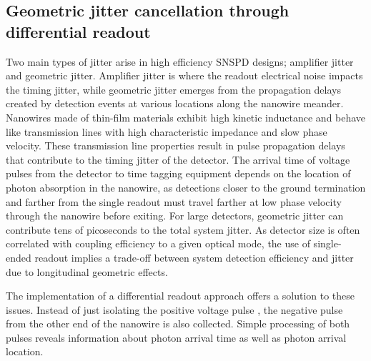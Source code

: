 \documentclass[11pt]{caltech_thesis} %
\begin{document}
\hypertarget{geometric-jitter-cancellation-through-differential-readout}{%
\subsection{Geometric jitter cancellation through differential readout}\label{geometric-jitter-cancellation-through-differential-readout}}

Two main types of jitter arise in high efficiency SNSPD designs; amplifier jitter and geometric jitter. Amplifier jitter is where the readout electrical noise impacts the timing jitter, while geometric jitter emerges from the propagation delays created by detection events at various locations along the nanowire meander. Nanowires made of thin-film materials exhibit high kinetic inductance and behave like transmission lines with high characteristic impedance and slow phase velocity. These transmission line properties result in pulse propagation delays that contribute to the timing jitter of the detector. The arrival time of voltage pulses from the detector to time tagging equipment depends on the location of photon absorption in the nanowire, as detections closer to the ground termination and farther from the single readout must travel farther at low phase velocity through the nanowire before exiting. For large detectors, geometric jitter can contribute tens of picoseconds to the total system jitter. As detector size is often correlated with coupling efficiency to a given optical mode, the use of single-ended readout implies a trade-off between system detection efficiency and jitter due to longitudinal geometric effects.

The implementation of a differential readout approach offers a solution to these issues. Instead of just isolating the positive voltage pulse , the negative pulse from the other end of the nanowire is also collected. Simple processing of both pulses reveals information about photon arrival time as well as photon arrival location.
\end{document}
